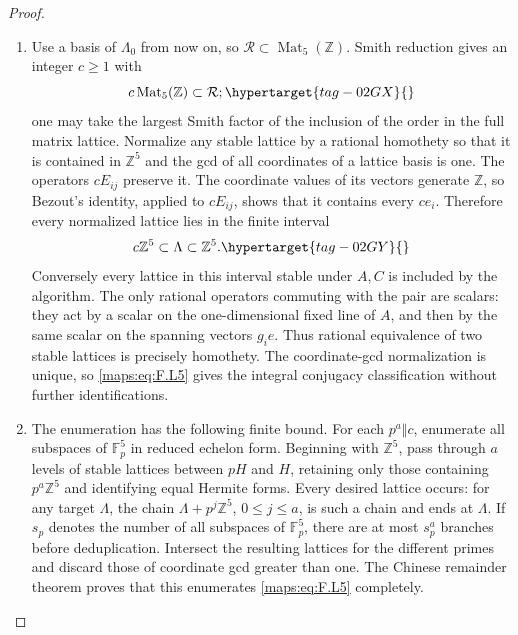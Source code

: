 \documentclass[11pt,a4paper]{article}
\numberwithin{equation}{section}
\theoremstyle{definition}
\begin{document}
\begin{proof}
\begin{enumerate}[label=\arabic*.]
\item Use a basis of $\Lambda_0$ from now on, so
$\mathcal R\subset\operatorname{Mat}_5(\mathbb Z)$.
Smith reduction gives an integer $c\ge1$ with
\begin{equation}
 c\operatorname{Mat}_5(\mathbb Z)\subset\mathcal R;
 \hypertarget{tag-02GX}{}\label{maps:eq:F.L4}
\end{equation}
one may take the largest Smith factor of the inclusion
of the order in the full matrix lattice.
Normalize any stable lattice by a rational homothety so
that it is contained in $\mathbb Z^5$ and the gcd of all
coordinates of a lattice basis is one.
The operators $cE_{ij}$ preserve it.  The coordinate values
of its vectors generate $\mathbb Z$, so Bezout's identity,
applied to $cE_{ij}$, shows that it contains every $ce_i$.
Therefore every normalized lattice lies in the finite interval
\begin{equation}
 c\mathbb Z^5\subset\Lambda\subset\mathbb Z^5.
 \hypertarget{tag-02GY}{}\label{maps:eq:F.L5}
\end{equation}
Conversely every lattice in this interval stable under
$A,C$ is included by the algorithm.
The only rational operators commuting with the pair are
scalars: they act by a scalar on the one-dimensional fixed
line of $A$, and then by the same scalar on the spanning
vectors $g_ie$.  Thus rational equivalence of two stable
lattices is precisely homothety.  The coordinate-gcd
normalization is unique, so \eqref{maps:eq:F.L5} gives the integral
conjugacy classification without further identifications.

\item The enumeration has the following finite bound.
For each $p^a\Vert c$, enumerate all subspaces of
$\mathbb F_p^5$ in reduced echelon form.
Beginning with $\mathbb Z^5$, pass through $a$ levels of
stable lattices between $pH$ and $H$, retaining only those
containing $p^a\mathbb Z^5$ and identifying equal Hermite
forms.  Every desired lattice occurs: for any target
$\Lambda$, the chain
$\Lambda+p^j\mathbb Z^5$, $0\le j\le a$, is such a
chain and ends at $\Lambda$.
If $s_p$ denotes the number of all subspaces of
$\mathbb F_p^5$, there are at most $s_p^a$ branches before
deduplication.  Intersect the resulting lattices for the
different primes and discard those of coordinate gcd
greater than one.  The Chinese remainder theorem proves
that this enumerates \eqref{maps:eq:F.L5} completely.


\end{enumerate}
\end{proof}
\end{document}
